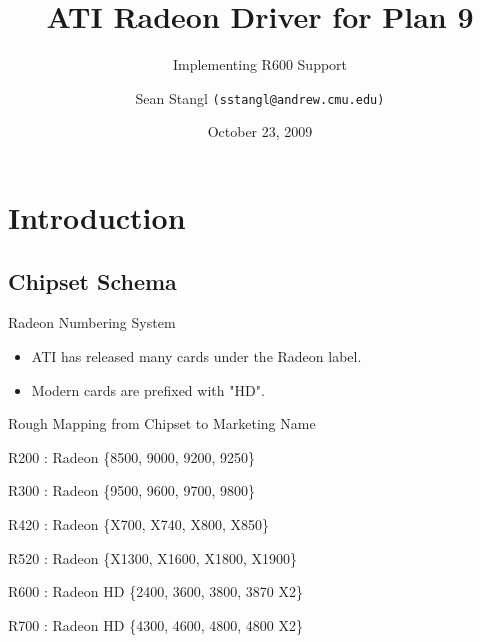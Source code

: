 \documentclass[xcolor=dvipsnames]{beamer}
\title{ATI Radeon Driver for Plan 9}
\subtitle{Implementing R600 Support}
\author{Sean Stangl \texttt{(sstangl@andrew.cmu.edu)}}
\institute[15-412]{15-412, Carnegie Mellon University}
\date{October 23, 2009}
\begin{document}
\normalem
\begin{frame}
  \titlepage
\end{frame}


\begin{frame}
	\tableofcontents
\end{frame}



\section{Introduction}

\subsection{Chipset Schema}

\begin{frame}[t]{Radeon Numbering System}

	\begin{itemize}
		\item ATI has released many cards under the Radeon label.
		\item Modern cards are prefixed with "HD".
	\end{itemize}

	\begin{block}{Rough Mapping from Chipset to Marketing Name}
		\begin{description}
			\item{R200 :} Radeon \{8500, 9000, 9200, 9250\}
			\item{R300 :} Radeon \{9500, 9600, 9700, 9800\}
			\item{R420 :} Radeon \{X700, X740, X800, X850\}
			\item{R520 :} Radeon \{X1300, X1600, X1800, X1900\}
			\item{R600 :} Radeon HD \{2400, 3600, 3800, 3870 X2\}
			\item{R700 :} Radeon HD \{4300, 4600, 4800, 4800 X2\}
		\end{description}
	\end{block}

\end{frame}
\end{document}
